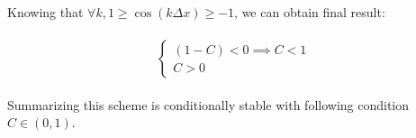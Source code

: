	Knowing that $ \forall k,  1 \geq \cos(k\Delta x) \geq -1$, we can obtain final result:
	
	\begin{align}
		\begin{split}
			\begin{cases}
				(1-C) <0 \implies C < 1 \\
				C > 0
			\end{cases}
		\end{split}
	\end{align} 
	
	Summarizing this scheme is conditionally stable with following condition $C \in (0, 1)$.
	
	
	